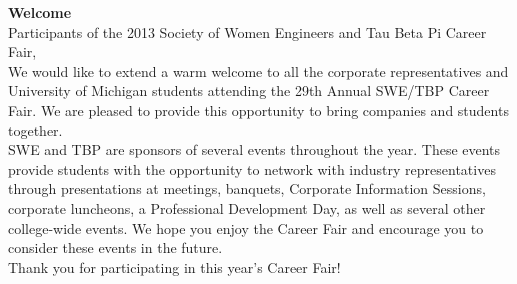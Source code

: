 \documentclass[twoside]{article}
\begin{document}

\startforewardsection
{ \fontsize{16}{19}\selectfont \bf Welcome}\\Participants of the 2013 Society of Women Engineers and Tau Beta Pi Career Fair, \\

We would like to extend a warm welcome to all the corporate representatives and University of Michigan students attending the 29th Annual SWE/TBP Career Fair. We are pleased to provide this opportunity to bring companies and students together. \\

SWE and TBP are sponsors of several events throughout the year. These events provide students with the opportunity to network with industry representatives through presentations at meetings, banquets, Corporate Information Sessions, corporate luncheons, a Professional Development Day, as well as several other college-wide events. We hope you enjoy the Career Fair and encourage you to consider these events in the future.  \\

Thank you for participating in this year's Career Fair!\\
\end{document}
